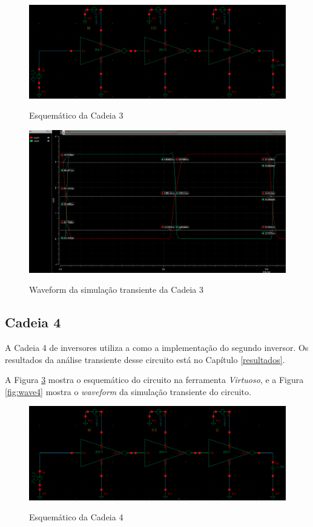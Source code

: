 \documentclass{iiufrgs}
\newcommand{\virtuoso}{\textit{Virtuoso}}
\begin{document}
\begin{figure}[htbp]
    \centering
    \caption{Esquemático da Cadeia 3}
    \includegraphics[scale=0.33]{images/circ3.png}
    \label{fig:circ_e3}
\end{figure}

\begin{figure}[htbp]
    \centering
    \caption{Waveform da simulação transiente da Cadeia 3}
    \includegraphics[scale=0.4]{images/wave_ex3.png}
    \label{fig:wave3}
\end{figure}

\FloatBarrier

\subsection{Cadeia 4}
A Cadeia 4 de inversores utiliza a  como a implementação do segundo inversor. Os resultados da análise transiente desse circuito está no Capítulo \ref{resultados}.\

A Figura \ref{fig:circ_e4} mostra o esquemático do circuito na ferramenta \virtuoso, e a Figura \ref{fig:wave4} mostra o \textit{waveform} da simulação transiente do circuito.\

\begin{figure}[htbp]
    \centering
    \caption{Esquemático da Cadeia 4}
    \includegraphics[scale=0.33]{images/circ4.png}
    \label{fig:circ_e4}
\end{figure}
\end{document}
